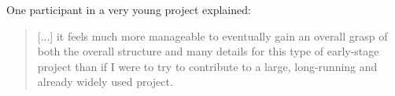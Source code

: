 One participant in a very young project explained: 

\begin{quote}
[...] it feels much more manageable to eventually gain an overall grasp of both the overall structure and many details for this type of early-stage project than if I were to try to contribute to a large, long-running and already widely used project.
\end{quote}